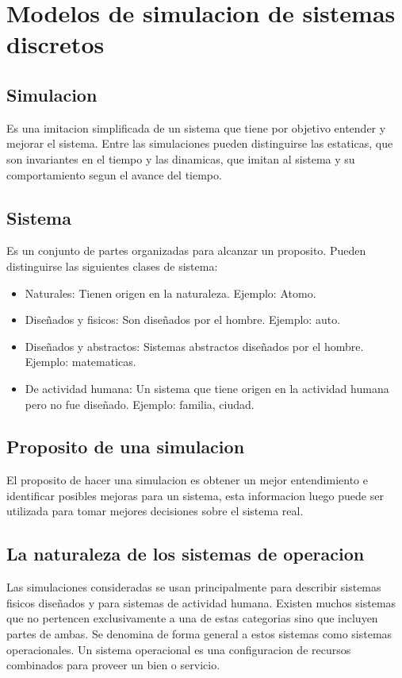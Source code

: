 \documentclass[a4paper]{article}
\begin{document}
\section{Modelos de simulacion de sistemas discretos}
\subsection{Simulacion}
Es una imitacion simplificada de un sistema que tiene por objetivo entender
y mejorar el sistema. Entre las simulaciones pueden distinguirse
las estaticas, que son invariantes en el tiempo y las dinamicas, que imitan
al sistema y su comportamiento segun el avance del tiempo.

\subsection{Sistema} %
Es un conjunto de partes organizadas para alcanzar un proposito.
Pueden distinguirse las siguientes clases de sistema:
\begin{itemize}
    \item Naturales: Tienen origen en la naturaleza. Ejemplo: Atomo.
    \item Diseñados y fisicos: Son diseñados por el hombre. Ejemplo: auto.
    \item Diseñados y abstractos: Sistemas abstractos diseñados por el
        hombre. Ejemplo: matematicas.
    \item De actividad humana: Un sistema que tiene origen en la actividad
        humana pero no fue diseñado. Ejemplo: familia, ciudad.
\end{itemize}

\subsection{Proposito de una simulacion}
El proposito de hacer una simulacion es obtener un mejor entendimiento e
identificar posibles mejoras para un sistema, esta informacion luego puede
ser utilizada para tomar mejores decisiones sobre el sistema real.

\subsection{La naturaleza de los sistemas de operacion}
Las simulaciones consideradas se usan principalmente para describir
sistemas fisicos diseñados y para sistemas de actividad humana.
Existen muchos sistemas que no pertencen exclusivamente a una de estas
categorias sino que incluyen partes de ambas. Se denomina de forma general
a estos sistemas como sistemas operacionales. Un sistema operacional es
una configuracion de recursos combinados para proveer un bien o servicio.
\end{document}
